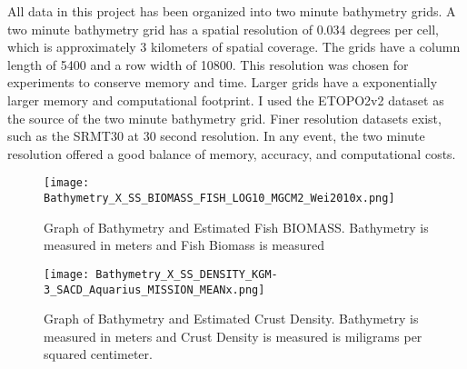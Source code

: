 \par
All data in this project has been organized into two minute bathymetry grids.
A two minute bathymetry grid has a spatial resolution of 0.034 degrees per cell, which is approximately 3 kilometers of spatial coverage.
The grids have a column length of 5400 and a row width of 10800.
This resolution was chosen for experiments to conserve memory and time.
Larger grids have a exponentially larger memory and computational footprint.
I used the \ac{ETOPO}2v2 \cite{national1988etopo} dataset as the source of the two minute bathymetry grid.
Finer resolution datasets exist, such as the SRMT30 \cite{becker2009global} at 30 second resolution.
In any event, the two minute resolution offered a good balance of memory, accuracy, and computational costs.


\begin{figure}[h]
    \centering
    \texttt{[image: Bathymetry\_X\_SS\_BIOMASS\_FISH\_LOG10\_MGCM2\_Wei2010x.png]}
    \caption{Graph of Bathymetry and Estimated Fish BIOMASS. Bathymetry is measured in meters and Fish Biomass is measured }
    \label{fig:bathyxfish}
\end{figure}


\begin{figure}[h]
    \centering
    \texttt{[image: Bathymetry\_X\_SS\_DENSITY\_KGM-3\_SACD\_Aquarius\_MISSION\_MEANx.png]}
    \caption{Graph of Bathymetry and Estimated Crust Density. Bathymetry is measured in meters and Crust Density is measured is miligrams per squared centimeter.}
    \label{fig:bathyxdensity}
\end{figure}





